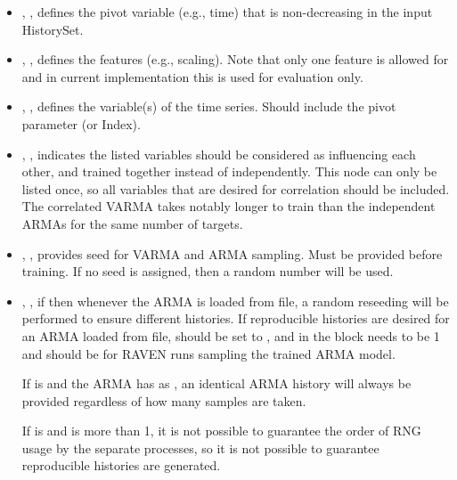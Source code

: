 \begin{itemize}
  \item {}, , defines the pivot variable (e.g., time) that is non-decreasing in
  the input HistorySet.
  \item {}, , defines the features (e.g., scaling). Note that only
  one feature is allowed for  and in current implementation this is used for evaluation only.
  \item {}, , defines the variable(s) of the
    time series.  Should include the pivot parameter (or Index).
  \item {}, , indicates the listed variables
    should be considered as influencing each other, and trained together instead of independently.  This node
    can only be listed once, so all variables that are desired for correlation should be included.  \nb The
    correlated VARMA takes notably longer to train than the independent ARMAs for the same number of targets.
  \item {}, , provides seed for VARMA and ARMA sampling. 
   Must be provided before training. If no seed is assigned, 
   then a random number will be used.
   
   \item {}, , if  then whenever the ARMA is loaded from file, a
    random reseeding will be performed to ensure different histories. \nb If reproducible histories are desired for an ARMA loaded from file,
     should be set to , and in the  block  needs to be 1 
    and  should be
      for RAVEN runs sampling the trained ARMA model.

If  is  and the ARMA has  as , an identical ARMA history will always be provided regardless of how many samples are taken.

If  is  and  is more than 1, it is not possible to guarantee the order of RNG usage by the separate processes, so it is not possible to guarantee reproducible histories are generated.        
  

\end{itemize}
